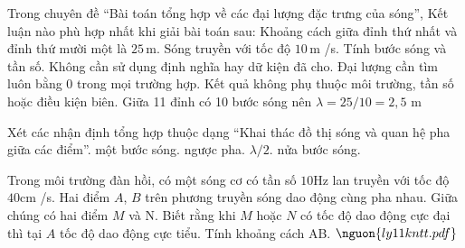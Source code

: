\begin{ex}
Trong chuyên đề “Bài toán tổng hợp về các đại lượng đặc trưng của sóng”, Kết luận nào phù hợp nhất khi giải bài toán sau: Khoảng cách giữa đỉnh thứ nhất và đỉnh thứ mười một là $25\,\text{m}$. Sóng truyền với tốc độ $10\,\text{m}$ /s. Tính bước sóng và tần số.
\choice
{Không cần sử dụng định nghĩa hay dữ kiện đã cho.}
{Đại lượng cần tìm luôn bằng 0 trong mọi trường hợp.}
{Kết quả không phụ thuộc môi trường, tần số hoặc điều kiện biên.}
{\True Giữa 11 đỉnh có 10 bước sóng nên $\lambda=25/10=2,5$ m}
\end{ex}

\begin{ex}
Xét các nhận định tổng hợp thuộc dạng “Khai thác đồ thị sóng và quan hệ pha giữa các điểm”.
\choiceTF
{\True một bước sóng.}
{\True ngược pha.}
{\True $\lambda/2$.}
{nửa bước sóng.}
\end{ex}

\begin{ex}
Trong môi trường đàn hồi, có một sóng cơ có tần số $10 \mathrm{Hz}$ lan truyền với tốc độ $40 \mathrm{cm}$ /s. Hai điểm $A$, $B$ trên phương truyền sóng dao động cùng pha nhau. Giữa chúng có hai điểm $M$ và N. Biết rằng khi $M$ hoặc $N$ có tốc độ dao động cực đại thì tại $A$ tốc độ dao động cực tiểu. Tính khoảng cách AB. $\nguon{ly11 kntt.pdf}$
\choiceTF

\end{ex}

